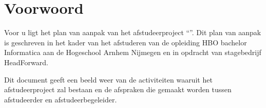 \chapter{Voorwoord}
Voor u ligt het plan van aanpak van het afstudeerproject ``\thesisTitle''. Dit plan van aanpak is geschreven in het kader van het afstuderen van de opleiding HBO bachelor Informatica aan de Hogeschool Arnhem Nijmegen en in opdracht van stagebedrijf HeadForward.\par
Dit document geeft een beeld weer van de activiteiten waaruit het afstudeerproject zal bestaan en de afspraken die gemaakt worden tussen afstudeerder en afstudeerbegeleider.